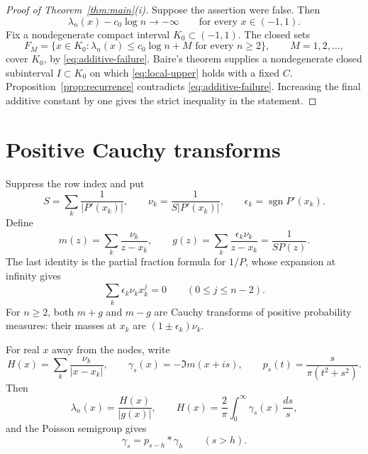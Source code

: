 \documentclass[11pt]{article}
\numberwithin{equation}{section}
\begin{document}
\begin{proof}[Proof of Theorem~\ref{thm:main}(i)]
Suppose the assertion were false. Then
\begin{equation}\label{eq:additive-failure}
 \lambda_n(x)-c_0\log n\longrightarrow-\infty
 \qquad\text{for every }x\in(-1,1).
\end{equation}
Fix a nondegenerate compact interval \(K_0\subset(-1,1)\). The closed sets
\[
 F_M=\{x\in K_0:\lambda_n(x)\le c_0\log n+M
                   \text{ for every }n\ge2\},
 \qquad M=1,2,\ldots,
\]
cover \(K_0\), by \eqref{eq:additive-failure}. Baire's theorem supplies
a nondegenerate closed subinterval \(I\subset K_0\) on which
\eqref{eq:local-upper} holds with a fixed \(C\).
Proposition~\ref{prop:recurrence} contradicts
\eqref{eq:additive-failure}. Increasing the final additive constant by
one gives the strict inequality in the statement.
\end{proof}

\section{Positive Cauchy transforms}\label{sec:cauchy}

Suppress the row index and put
\[
 S=\sum_k\frac1{|P'(x_k)|},\qquad
 \nu_k=\frac1{S|P'(x_k)|},\qquad
 \epsilon_k=\operatorname{sgn}P'(x_k).
\]
Define
\begin{equation}\label{eq:transforms}
 m(z)=\sum_k\frac{\nu_k}{z-x_k},\qquad
 g(z)=\sum_k\frac{\epsilon_k\nu_k}{z-x_k}
     =\frac1{SP(z)}.
\end{equation}
The last identity is the partial fraction formula for \(1/P\), whose expansion
at infinity gives
\begin{equation}\label{eq:moments}
 \sum_k\epsilon_k\nu_kx_k^j=0\qquad(0\le j\le n-2).
\end{equation}
For \(n\ge2\), both \(m+g\) and \(m-g\) are Cauchy transforms of positive
probability measures: their masses at \(x_k\) are \((1\pm\epsilon_k)\nu_k\).

For real \(x\) away from the nodes, write
\[
 H(x)=\sum_k\frac{\nu_k}{|x-x_k|},\qquad
 \gamma_s(x)=-\Im m(x+is),\qquad
 p_s(t)=\frac{s}{\pi(t^2+s^2)}.
\]
Then
\begin{equation}\label{eq:lebesgue-transform}
 \lambda_n(x)=\frac{H(x)}{|g(x)|},\qquad
 H(x)=\frac2\pi\int_0^\infty\gamma_s(x)\,\frac{ds}{s},
\end{equation}
and the Poisson semigroup gives
\begin{equation}\label{eq:semigroup}
 \gamma_s=p_{s-h}*\gamma_h\qquad(s>h).
\end{equation}
\end{document}
